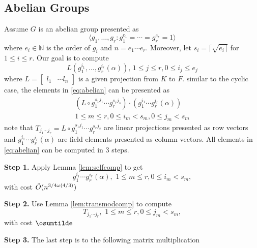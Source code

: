 \subsection{Abelian Groups}
Assume $G$ is an abelian group presented as 
$$ \langle g_1, \ldots , g_r: g_{1}^{e_1} = \cdots = g_{r}^{e_r} = 1 \rangle$$
 where $ e_i \in \mathbb{N}$
is the order of $g_i$ and $n = e_1 \cdots e_r$. Moreover, let $s_i = \lceil	\sqrt{e_i \rceil}$ for $ 1\leq i \leq r$.
 Our goal is to compute 
\begin{equation}\label{eq:abelian}
L (g_1^{i_1},  \ldots, g_r^{i_r}(\alpha)), \, 1 \leq j \leq r, 0 \leq i_j \leq e_j
\end{equation}
 where $L = \begin{bmatrix} l_1 & \cdots l_n \end{bmatrix}$ is a given projection from $K$ to $F$. 
similar to the cyclic case, the elements in \eqref{eq:abelian} can be presented as 
\begin{equation}
\begin{split}
(L \circ g_1^{s_1j_1} \cdots g_r^{s_rj_s})\cdot (g_1^{i_1} \cdots g_r^{i_r}(\alpha))\\ 1\leq m \leq r, 0\leq i_m < s_m, 0 \leq j_m < s_m
\end{split}
\end{equation}
note that $T_{j_1\cdots j_r} = L \circ g_1^{s_1j_1} \cdots g_r^{s_rj_s}$ are linear projections 
presented as row vectors and $g_1^{i_1} \cdots g_r^{i_r}(\alpha)$ are field elements presented as column vectors. All elements in \eqref{eq:abelian} can be computed in 3 steps.

\textbf{Step 1.} Apply Lemma \ref{lem:selfcomp} to get 
$$g_1^{i_1} \cdots g_r^{i_r}(\alpha), \,\, 1\leq m \leq r, 0\leq i_m < s_m,$$
with cost $\tilde{O}(n^{3/4 \omega(4/3)})$

\textbf{Step 2.} Use Lemma \ref{lem:transmodcomp} to compute 
$$T_{j_1\cdots j_r}, \,\, 1\leq m \leq r, 0 \leq j_m < s_m,$$
with cost $\osumtilde$

\textbf{Step 3.} The last step is to the following matrix multiplication

